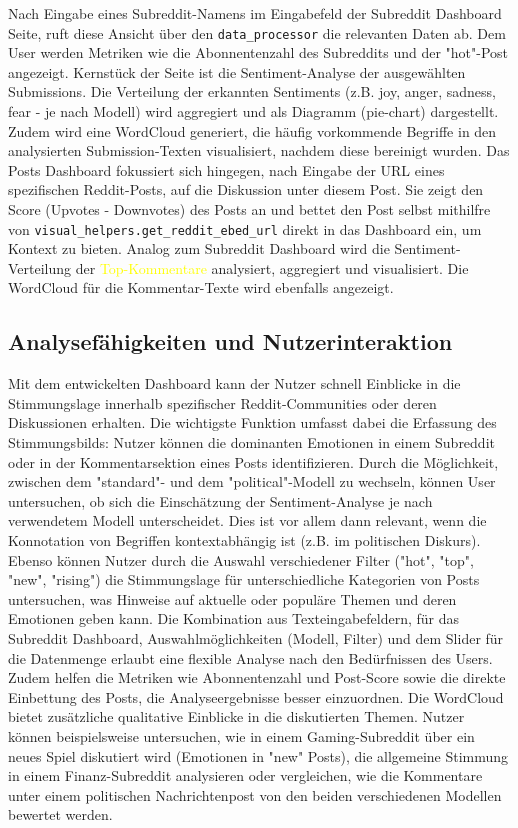 Nach Eingabe eines Subreddit-Namens im Eingabefeld der Subreddit Dashboard Seite, ruft diese Ansicht über den \verb|data_processor| die relevanten Daten ab. Dem User werden Metriken wie die Abonnentenzahl des Subreddits und der "hot"-Post angezeigt. Kernstück der Seite ist die Sentiment-Analyse der ausgewählten Submissions. Die Verteilung der erkannten Sentiments (z.B. joy, anger, sadness, fear - je nach Modell) wird aggregiert und als Diagramm (pie-chart) dargestellt. Zudem wird eine WordCloud generiert, die häufig vorkommende Begriffe in den analysierten Submission-Texten visualisiert, nachdem diese bereinigt wurden. 
Das Posts Dashboard fokussiert sich hingegen, nach Eingabe der URL eines spezifischen Reddit-Posts, auf die Diskussion unter diesem Post. Sie zeigt den Score (Upvotes - Downvotes) des Posts an und bettet den Post selbst mithilfre von \verb|visual_helpers.get_reddit_ebed_url| direkt in das Dashboard ein, um Kontext zu bieten. Analog zum Subreddit Dashboard wird die Sentiment-Verteilung der \textcolor{yellow}{Top-Kommentare}  analysiert, aggregiert und visualisiert. Die WordCloud für die Kommentar-Texte wird ebenfalls angezeigt.

\subsection{Analysefähigkeiten und Nutzerinteraktion}

Mit dem entwickelten Dashboard kann der Nutzer schnell Einblicke in die Stimmungslage innerhalb spezifischer Reddit-Communities oder deren Diskussionen erhalten. Die wichtigste Funktion umfasst dabei die Erfassung des Stimmungsbilds: Nutzer können die dominanten Emotionen in einem Subreddit oder in der Kommentarsektion eines Posts identifizieren. Durch die Möglichkeit, zwischen dem "standard"- und dem "political"-Modell zu wechseln, können User untersuchen, ob sich die Einschätzung der Sentiment-Analyse je nach verwendetem Modell unterscheidet. Dies ist vor allem dann relevant, wenn die Konnotation von Begriffen kontextabhängig ist (z.B. im politischen Diskurs).
Ebenso können Nutzer durch die Auswahl verschiedener Filter ("hot", "top", "new", "rising") die Stimmungslage für unterschiedliche Kategorien von Posts untersuchen, was Hinweise auf aktuelle oder populäre Themen und deren Emotionen geben kann. Die Kombination aus Texteingabefeldern, für das Subreddit Dashboard, Auswahlmöglichkeiten (Modell, Filter) und dem Slider für die Datenmenge erlaubt eine flexible Analyse nach den Bedürfnissen des Users. Zudem helfen die Metriken wie Abonnentenzahl und Post-Score sowie die direkte Einbettung des Posts, die Analyseergebnisse besser einzuordnen.
Die WordCloud bietet zusätzliche qualitative Einblicke in die diskutierten Themen. Nutzer können beispielsweise untersuchen, wie in einem Gaming-Subreddit über ein neues Spiel diskutiert wird (Emotionen in "new" Posts), die allgemeine Stimmung in einem Finanz-Subreddit analysieren oder vergleichen, wie die Kommentare unter einem politischen Nachrichtenpost von den beiden verschiedenen Modellen bewertet werden.

